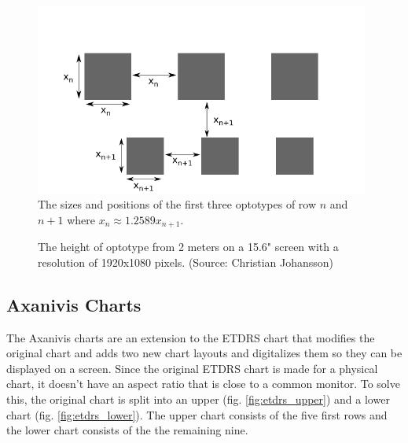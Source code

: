 \documentclass[12pt,a4paper,notitlepage]{report}
\begin{document}
\begin{figure}[ht!]
\centering
\includegraphics[width=110mm]{images/etdrs_chart_sizes.png}
\caption{The sizes and positions of the first three optotypes of row $n$ and $n+1$ where $x_n \approx 1.2589 x_{n+1}$. \label{fig:etdrs_chart_sizes}}
\end{figure} 

\begin{figure}[ht!]
\caption[Optotype Size Graph]{The height of optotype from 2 meters on a 15.6" screen with a resolution of 1920x1080 pixels. (Source: Christian Johansson)\label{fig:chart_size_plot}}
\end{figure}

\subsection{Axanivis Charts}
The Axanivis charts are an extension to the ETDRS chart that modifies the original chart and adds two new chart layouts and digitalizes them so they can be displayed on a screen. Since the original ETDRS chart is made for a physical chart, it doesn't have an aspect ratio \cite{Ferris} that is close to a common monitor. To solve this, the original chart is split into an upper (fig. \ref{fig:etdrs_upper}) and a lower chart (fig. \ref{fig:etdrs_lower}). The upper chart consists of the five first rows and the lower chart consists of the the remaining nine.
\end{document}
